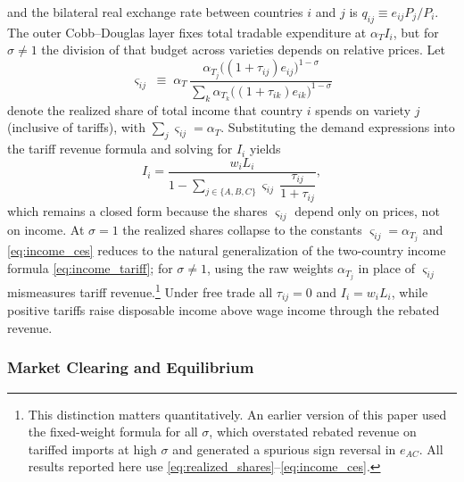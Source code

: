 \documentclass[11pt]{article}
\theoremstyle{plain}
\theoremstyle{remark}
\numberwithin{lemma}{section}
\numberwithin{proposition}{section}
\numberwithin{corollary}{section}
\newcommand{\rev}[1]{{\color{RevBlue}#1}}
\begin{document}
and the bilateral real exchange rate between countries $i$ and $j$ is $q_{ij} \equiv e_{ij} P_j / P_i$. \rev{The outer Cobb--Douglas layer fixes total tradable expenditure at $\alpha_T I_i$, but for $\sigma \neq 1$ the division of that budget across varieties depends on relative prices. Let
\begin{equation}
\varsigma_{ij} \;\equiv\; \alpha_T\, \frac{\alpha_{T_j} \bigl((1+\tau_{ij})e_{ij}\bigr)^{1-\sigma}}{\sum_{k} \alpha_{T_k} \bigl((1+\tau_{ik})e_{ik}\bigr)^{1-\sigma}}
\label{eq:realized_shares}
\end{equation}
denote the realized share of total income that country $i$ spends on variety $j$ (inclusive of tariffs), with $\sum_j \varsigma_{ij} = \alpha_T$. Substituting the demand expressions into the tariff revenue formula and solving for $I_i$ yields
\begin{equation}
I_i = \frac{w_i L_i}{1 - \displaystyle\sum_{j \in \{A,B,C\}} \varsigma_{ij}\, \dfrac{\tau_{ij}}{1+\tau_{ij}}},
\label{eq:income_ces}
\end{equation}
which remains a closed form because the shares $\varsigma_{ij}$ depend only on prices, not on income. At $\sigma = 1$ the realized shares collapse to the constants $\varsigma_{ij} = \alpha_{T_j}$ and \eqref{eq:income_ces} reduces to the natural generalization of the two-country income formula \eqref{eq:income_tariff}; for $\sigma \neq 1$, using the raw weights $\alpha_{T_j}$ in place of $\varsigma_{ij}$ mismeasures tariff revenue.\footnote{\rev{This distinction matters quantitatively. An earlier version of this paper used the fixed-weight formula for all $\sigma$, which overstated rebated revenue on tariffed imports at high $\sigma$ and generated a spurious sign reversal in $e_{AC}$. All results reported here use \eqref{eq:realized_shares}--\eqref{eq:income_ces}.}} Under free trade all $\tau_{ij} = 0$ and $I_i = w_i L_i$, while positive tariffs raise disposable income above wage income through the rebated revenue.}

\subsubsection{Market Clearing and Equilibrium}
\label{sec:equilibrium}
\end{document}
